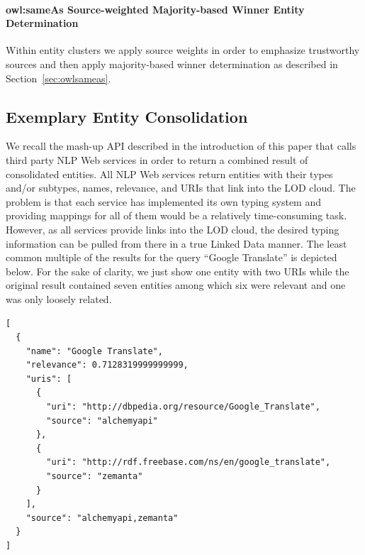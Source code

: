 \documentclass[twocolumn]{article}
\begin{document}
\paragraph{owl:sameAs Source-weighted Majority-based Winner Entity Determination}
Within entity clusters we apply source weights in order to emphasize trustworthy sources and then apply
majority-based winner determination as described in Section~\ref{sec:owlsameas}.

\subsection{Exemplary Entity Consolidation}                     \label{sec:consolidation-nlp}
We recall the mash-up API described in the introduction of this paper that calls third party NLP Web services in order to return a combined result of consolidated entities.
All NLP Web services return entities with their types and/or subtypes, names,
relevance, and URIs that link into the LOD cloud. The problem is that each service has implemented its own typing
system and providing mappings for all of them would be a relatively time-consuming task. However, as all services
provide links into the LOD cloud, the desired typing information can be pulled from there in a true Linked Data manner. The least common
multiple of the results for the query ``Google Translate'' is depicted below. For the sake of clarity, we just show one
entity with two URIs while the original result contained seven entities among which six were relevant and one was only loosely related.
\begin{lstlisting}
[
  {
    "name": "Google Translate",
    "relevance": 0.7128319999999999,
    "uris": [
      {
        "uri": "http://dbpedia.org/resource/Google_Translate",
        "source": "alchemyapi"
      },
      {
        "uri": "http://rdf.freebase.com/ns/en/google_translate",
        "source": "zemanta"
      }
    ],
    "source": "alchemyapi,zemanta"
  }
]
\end{lstlisting}
\end{document}
